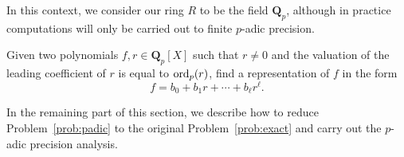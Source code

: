 In this context, we consider our ring $R$ to be the field $\mathbf{Q}_p$, 
although in practice computations will only be carried out to finite 
$p$-adic precision.

\begin{prob} \label{prob:padic}
Given two polynomials $f, r \in \mathbf{Q}_p[X]$ such that 
$r \neq 0$ and the valuation of the leading coefficient of 
$r$ is equal to $\operatorname{ord}_p(r)$, find a representation of $f$ 
in the form
\begin{equation}
f = b_0 + b_1 r + \dotsb + b_{\ell} r^{\ell}.
\end{equation}
\end{prob}

In the remaining part of this section, we describe how to 
reduce Problem~\ref{prob:padic} to the original 
Problem~\ref{prob:exact} and carry out the $p$-adic precision 
analysis.

